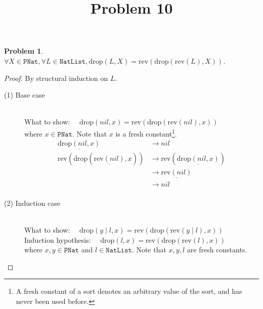 \documentclass[12pt, a4paper]{article}
\title{Problem 10}
\date{\vspace{-5ex}}
\newtheorem{problem}{Problem}
\newcommand{\rel}[1]{\mathrel{#1}}
\newcommand{\rmx}[1]{\mathrm{#1}}
\newcommand{\larrow}{\longrightarrow}
\newcommand{\under}{\underline}
\begin{document}
\maketitle

\begin{problem}
$\forall X \in \mathtt{PNat}, \forall L \in \mathtt{NatList}, \rmx{drop}(L, X) = \rmx{rev}(\rmx{drop}(\rmx{rev}(L), X))$.
\end{problem}
\begin{proof}
By structural induction on $L$.

\begin{description}
\item[(1) Base case]~\\
\noindent
What to show: $\quad \rmx{drop}(nil, x) = \rmx{rev}(\rmx{drop}(\rmx{rev}(nil), x))$ \\
where $x \in \mathtt{PNat}$.
Note that $x$ is a fresh constant\footnote{A fresh constant of a sort denotes an arbitrary value of the sort, and has never been used before.}.
\begin{align*}
\under{\rmx{drop}(nil, x)}
	&\larrow nil \tag{by drop1} \\
\rmx{rev}(\rmx{drop}(\under{\rmx{rev}(nil)}, x))
	&\larrow \rmx{rev}(\under{\rmx{drop}(nil, x)}) \tag{by rev1} \\
	&\larrow \under{\rmx{rev}(nil)} \tag{by drop1} \\
	&\larrow nil \tag{by rev1} \\
\end{align*}

\item[(2) Induction case]~\\
What to show: $\quad \rmx{drop}(y \rel{|} l, x) = \rmx{rev}(\rmx{drop}(\rmx{rev}(y \rel{|} l), x))$ \\
Induction hypothesis: $\quad \rmx{drop}(l, x) = \rmx{rev}(\rmx{drop}(\rmx{rev}(l), x))$  \\
where $x, y \in \mathtt{PNat}$ and $l \in \mathtt{NatList}$.
Note that $x, y, l$ are fresh constants.


\end{description}
\end{proof}
\end{document}
